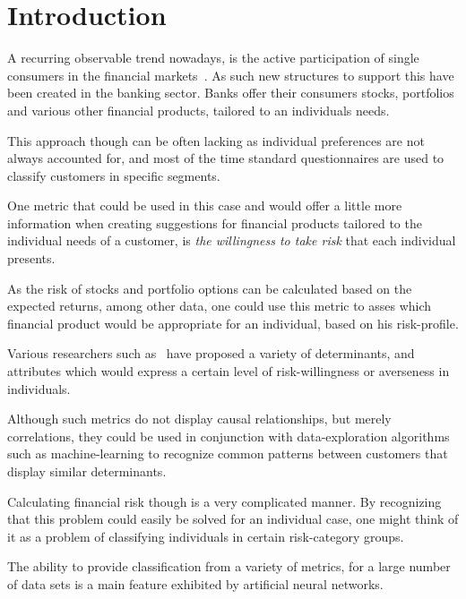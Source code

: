 \documentclass[12pt]{article}
\begin{document}

\clearpage

\clearpage

\clearpage

\clearpage
\tableofcontents
\clearpage
\listoffigures
\clearpage
\listoftables
\clearpage
\printglossaries
\clearpage

\section{Introduction}
\label{sec:Introduction}

A recurring observable trend nowadays, is the active participation of single consumers in the financial markets~\citep{barasinska}. As such new structures to support this have been created in the banking sector. Banks offer their consumers stocks, portfolios and various other financial products, tailored to an individuals needs. 

This approach though can be often lacking as individual preferences are not always accounted for, and most of the time standard questionnaires are used to classify customers in specific segments.

One metric that could be used in this case and would offer a little more information when creating suggestions for financial products tailored to the individual needs of a customer, is \emph{the willingness to take risk} that each individual presents. 

As the risk of stocks and portfolio options can be calculated based on the expected returns, among other data, one could use this metric to asses which financial product would be appropriate for an individual, based on his risk-profile.

Various researchers such as~\citet{individualRiskAttitudes} have proposed a variety of determinants, and attributes which would express a certain level of risk-willingness or averseness in individuals. 

Although such metrics do not display causal relationships, but merely correlations, they could be used in conjunction with data-exploration algorithms such as machine-learning to recognize common patterns between customers that display similar determinants.

Calculating financial risk though is a very complicated manner. By recognizing that this problem could easily be solved for an individual case, one might think of it as a problem of classifying individuals in certain risk-category groups. 

The ability to provide classification from a variety of metrics, for a large number of data sets is a main feature exhibited by artificial neural networks. 
\end{document}
